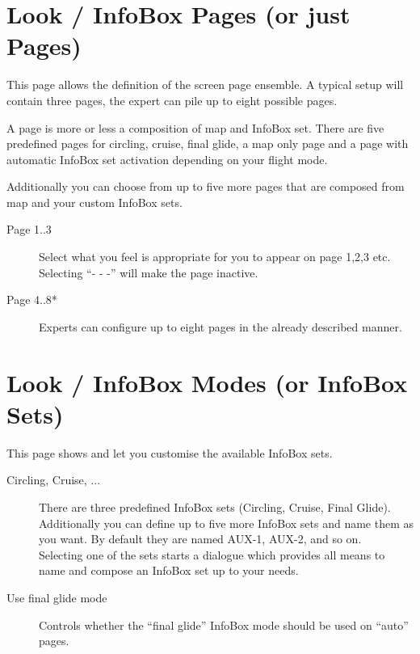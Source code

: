 \section{Look / InfoBox Pages (or just Pages)}\label{conf:screenpages}

This page allows the definition of the screen page ensemble. A typical setup 
will contain three pages, the expert can pile up to eight possible pages.

A page is more or less a composition of map and InfoBox set. There are five 
predefined pages for circling, cruise, final glide, a map only page and a 
page with automatic InfoBox set activation depending on your flight mode.

Additionally you can choose from up to five more pages that are composed from map 
and your custom InfoBox sets.  

\begin{description}
\item[Page 1..3]  Select what you feel is appropriate for you to appear on page 1,2,3 etc. 
  Selecting ``- - -'' will make the page inactive.
\item[Page 4..8*]  Experts can configure up to eight pages in the already 
  described manner.
\end{description}


\section{Look / InfoBox Modes (or InfoBox Sets)}\label{sec:infobox_sets}
\label{conf:infobox_sets}

This page shows and let you customise the available InfoBox sets.

\begin{description}
\item[Circling, Cruise, ...]  There are three predefined InfoBox sets (Circling, Cruise, Final Glide). 
  Additionally you can define up to five more InfoBox sets and name them as you want.   
  By default they are named AUX-1, AUX-2, and so on. \\
  Selecting one of the sets starts a dialogue which provides all means to name and 
  compose an InfoBox set up to your needs.

\item[Use final glide mode]  Controls whether the ``final glide'' InfoBox mode should be used on ``auto'' pages.
\end{description}

